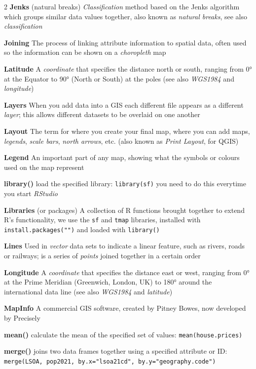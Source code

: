 \documentclass[a4paper,10pt]{article}
\begin{document}
\begin{multicols}{2}
\textbf{Jenks} (natural breaks) \textit{Classification} method based on the Jenks algorithm which groups similar data values together, also known as \textit{natural breaks}, see also \textit{classification}

\textbf{Joining} The process of linking attribute information to spatial data, often used so the information can be shown on a \textit{choropleth} map 

\textbf{Latitude} A \textit{coordinate} that specifies the distance north or south, ranging from \ang{0} at the Equator to \ang{90} (North or South) at the poles (see also \textit{WGS1984} and \textit {longitude})

\textbf{Layers} When you add data into a GIS each different file appears as a different \textit{layer}; this allows different datasets to be overlaid on one another

\textbf{Layout} The term for where you create your final map, where you can add maps, \textit{legends}, \textit{scale bars}, \textit{north arrows}, etc. (also known as \textit{Print Layout}, for QGIS)

\textbf{Legend} An important part of any map, showing what the symbols or colours used on the map represent 

\textbf{library()} load the specified library: \texttt{library(sf)} you need to do this everytime you start \textit{RStudio}

\textbf{Libraries} (or packages) A collection of R functions brought together to extend R's functionality, we use the \texttt{sf} and \texttt{tmap} libraries, installed with \texttt{install.packages("")} and loaded with \texttt{library()}

\textbf{Lines} Used in \textit{vector} data sets to indicate a linear feature, such as rivers, roads or railways; is a series of \textit{points} joined together in a certain order

\textbf{Longitude} A \textit{coordinate} that specifies the distance east or west, ranging from \ang{0} at the Prime Meridian (Greenwich, London, UK) to \ang{180} around the international data line (see also \textit{WGS1984} and \textit{latitude})

\textbf{MapInfo} A commercial GIS software, created by Pitney Bowes, now developed by Precisely 

\textbf{mean()} calculate the mean of the specified set of values: \texttt{mean(house.prices)}

\textbf{merge()} joins two data frames together using a specified attribute or ID: \texttt{merge(LSOA, pop2021, by.x="lsoa21cd", by.y="geography.code")}


\end{multicols}
\end{document}
